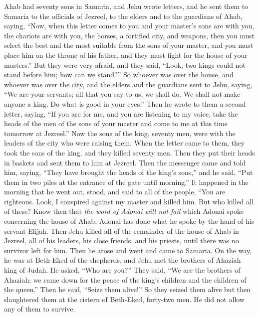 \begin{biblechapter} %
 Ahab had seventy sons in Samaria, and Jehu wrote letters, and he sent them to Samaria to the officials of Jezreel, to the elders and to the guardians of Ahab, saying,
\verse “Now, when this letter comes to you and your master’s sons are with you, the chariots are with you, the horses, a fortified city, and weapons,
\verse then you must select the best and the most suitable from the sons of your master, and you must place him on the throne of his father, and they must fight for the house of your masters.”
\verse But they were very afraid, and they said, “Look, two kings could not stand before him; how can we stand?”
\verse So whoever was over the house, and whoever was over the city, and the elders and the guardians sent to Jehu, saying, “We are your servants; all that you say to us, we shall do. We shall not make anyone a king. Do what is good in your eyes.”
\verse Then he wrote to them a second letter, saying, “If you are for me, and you are listening to my voice, take the heads of the men of the sons of your master and come to me at this time tomorrow at Jezreel.” Now the sons of the king, seventy men, were with the leaders of the city who were raising them.
\verse When the letter came to them, they took the sons of the king, and they killed seventy men. Then they put their heads in baskets and sent them to him at Jezreel.
\verse Then the messenger came and told him, saying, “They have brought the heads of the king’s sons,” and he said, “Put them in two piles at the entrance of the gate until morning.”
\verse It happened in the morning that he went out, stood, and said to all of the people, “You are righteous. Look, I conspired against my master and killed him. But who killed all of these?
\verse Know then that \textit{the word of Adonai will not fail} which Adonai spoke concerning the house of Ahab; Adonai has done what he spoke by the hand of his servant Elijah.
\verse Then Jehu killed all of the remainder of the house of Ahab in Jezreel, all of his leaders, his close friends, and his priests, until there was no survivor left for him.
\verse Then he arose and went and came to Samaria. On the way, he was at Beth-Eked of the shepherds,
\verse and Jehu met the brothers of Ahaziah king of Judah. He asked, “Who are you?” They said, “We are the brothers of Ahaziah; we came down for the peace of the king’s children and the children of the queen.”
\verse Then he said, “Seize them alive!” So they seized them alive but then slaughtered them at the cistern of Beth-Eked, forty-two men. He did not allow any of them to survive.

\end{biblechapter}
